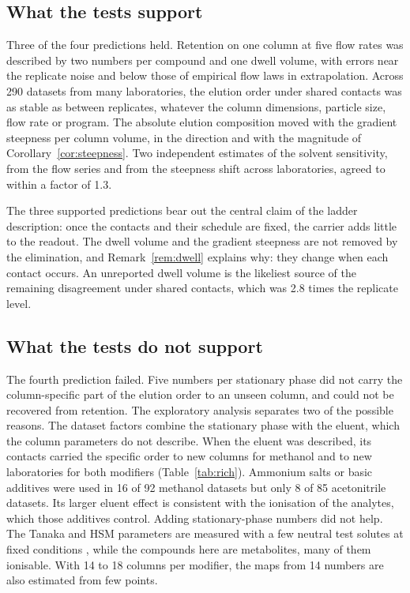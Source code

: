 \documentclass[11pt,a4paper]{article}
\theoremstyle{definition}
\theoremstyle{remark}
\begin{document}
\subsection{What the tests support}

Three of the four predictions held.
Retention on one column at five flow rates was described by two numbers per compound and one dwell volume, with errors near the replicate noise and below those of empirical flow laws in extrapolation.
Across 290 datasets from many laboratories, the elution order under shared contacts was as stable as between replicates, whatever the column dimensions, particle size, flow rate or program.
The absolute elution composition moved with the gradient steepness per column volume, in the direction and with the magnitude of Corollary~\ref{cor:steepness}.
Two independent estimates of the solvent sensitivity, from the flow series and from the steepness shift across laboratories, agreed to within a factor of 1.3.

The three supported predictions bear out the central claim of the ladder description: once the contacts and their schedule are fixed, the carrier adds little to the readout.
The dwell volume and the gradient steepness are not removed by the elimination, and Remark~\ref{rem:dwell} explains why: they change when each contact occurs.
An unreported dwell volume is the likeliest source of the remaining disagreement under shared contacts, which was 2.8 times the replicate level.

\subsection{What the tests do not support}

The fourth prediction failed.
Five numbers per stationary phase did not carry the column-specific part of the elution order to an unseen column, and could not be recovered from retention.
The exploratory analysis separates two of the possible reasons.
The dataset factors combine the stationary phase with the eluent, which the column parameters do not describe.
When the eluent was described, its contacts carried the specific order to new columns for methanol and to new laboratories for both modifiers (Table~\ref{tab:rich}).
Ammonium salts or basic additives were used in 16 of 92 methanol datasets but only 8 of 85 acetonitrile datasets.
Its larger eluent effect is consistent with the ionisation of the analytes, which those additives control.
Adding stationary-phase numbers did not help.
The Tanaka and HSM parameters are measured with a few neutral test solutes at fixed conditions \citep{snyder2004,kimata1989}, while the compounds here are metabolites, many of them ionisable.
With 14 to 18 columns per modifier, the maps from 14 numbers are also estimated from few points.
\end{document}
